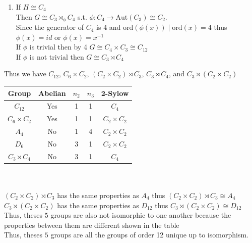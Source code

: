 \documentclass[12pt, letterpaper]{article}
\theoremstyle{definition}
\renewcommand{\t}[1]{\text{#1}}
\begin{document}
\begin{enumerate}
\begin{enumerate}
\begin{itemize}
\begin{itemize}
                \item $(g,h)\phi_1(a)=g \circ \phi_1(f(a))\circ g^{-1}=\phi_1(ab)=\phi_1(a)\phi_1(b)=c \circ id = c$
                \item $(g,h)\phi_1(b)=g \circ \phi_1(f(b))\circ g^{-1}=\phi_1(b)=id$
            \end{itemize}
            Thus $(g,h)\phi_1 = \phi_2$ thus by 4, \\$H \rtimes_{\phi_1} K \cong H \rtimes_{\phi_2} K$
        \end{itemize}
        Thus $H \rtimes_{\phi_1} K \cong H \rtimes_{\phi_2} K \cong H \rtimes_{\phi_3} K$\\
        Thus $G \cong C_3 \rtimes C_2 \times C_2$
        \item If $H \cong C_4$\\
        Then $G \cong C_3 \rtimes_\phi C_4$ s.t. $\phi : C_4 \rightarrow \t{Aut}(C_3) \cong C_2$.\\
        Since the generator of $C_4$ is $4$ and ord$(\phi(x)) \mid \t{ord}(x)=4$ thus $\phi(x)=id$ or $\phi(x)=x^{-1}$\\
        If $\phi$ is trivial then by 4 $G \cong C_4 \times C_3 \cong C_{12}$\\
        If $\phi$ is not trivial then $G \cong C_3 \rtimes C_4$
    \end{enumerate}
\end{enumerate}
Thus we have $C_{12}$, $C_6 \times C_2$, $(C_2 \times C_2) \rtimes C_3$, $C_3 \rtimes C_4$, and $C_3 \rtimes (C_2 \times C_2)$\\
\begin{tabular}{c c c c c}
    \hline
    \textbf{Group} & \textbf{Abelian} & \boldmath$n_2$ & \boldmath$n_3$ & \textbf{2-Sylow} \\ \hline
    \boldmath$C_{12}$ & Yes & 1 & 1 & $C_4$ \\ \hline
    \boldmath$C_6 \times C_2$ & Yes & 1 & 1 & $C_2 \times C_2$ \\ \hline
    \boldmath$A_4$ & No & 1 & 4 & $C_2 \times C_2$ \\ \hline
    \boldmath$D_6$ & No & 3 & 1 & $C_2 \times C_2$ \\ \hline
    \boldmath$C_3 \rtimes C_4$ & No & 3 & 1 & $C_4$ \\ \hline
\end{tabular}
\phantom{text}\\
\phantom{text}\\
$(C_2 \times C_2) \rtimes C_3$ has the same properties as $A_4$ thus $(C_2 \times C_2) \rtimes C_3 \cong A_4$\\
$C_3 \rtimes (C_2 \times C_2)$ has the same properties as $D_{12}$ thus $C_3 \rtimes (C_2 \times C_2) \cong D_{12}$\\
Thus, theses $5$ groups are also not isomorphic to one another because the properties between them are different shown in the table\\
Thus, theses $5$ groups are all the groups of order 12 unique up to isomorphism.
\end{document}

